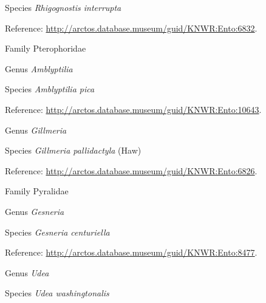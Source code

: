 \documentclass[9pt, article]{memoir}
\begin{document}
\begin{multicols}{2}
\vspace{6pt}\noindent\hspace{36pt}Species \textit{Rhigognostis interrupta}


\vspace{6pt}Reference: 
\url{http://arctos.database.museum/guid/KNWR:Ento:6832}.

\vspace{6pt}\noindent\hspace{24pt}Family Pterophoridae


\vspace{6pt}\noindent\hspace{30pt}Genus \textit{Amblyptilia}


\vspace{6pt}\noindent\hspace{36pt}Species \textit{Amblyptilia pica}


\vspace{6pt}Reference: 
\url{http://arctos.database.museum/guid/KNWR:Ento:10643}.

\vspace{6pt}\noindent\hspace{30pt}Genus \textit{Gillmeria}


\vspace{6pt}\noindent\hspace{36pt}Species \textit{Gillmeria pallidactyla} (Haw)


\vspace{6pt}Reference: 
\url{http://arctos.database.museum/guid/KNWR:Ento:6826}.

\vspace{6pt}\noindent\hspace{24pt}Family Pyralidae


\vspace{6pt}\noindent\hspace{30pt}Genus \textit{Gesneria}


\vspace{6pt}\noindent\hspace{36pt}Species \textit{Gesneria centuriella}


\vspace{6pt}Reference: 
\url{http://arctos.database.museum/guid/KNWR:Ento:8477}.

\vspace{6pt}\noindent\hspace{30pt}Genus \textit{Udea}


\vspace{6pt}\noindent\hspace{36pt}Species \textit{Udea washingtonalis}



\end{multicols}
\end{document}

